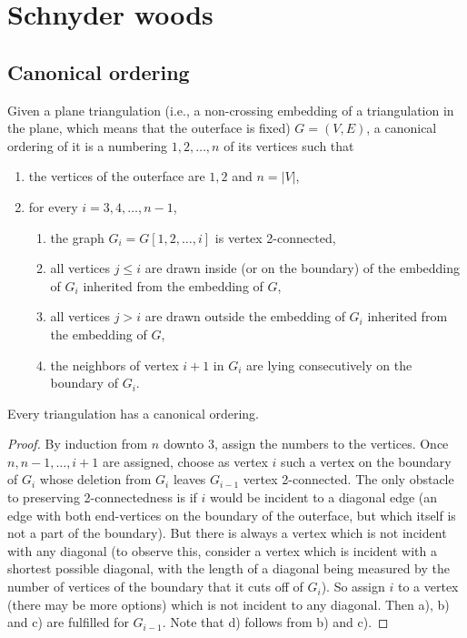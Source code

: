 \chapter{Schnyder woods}

\section{Canonical ordering}

\begin{defn}
	Given a plane triangulation (i.e., a non-crossing embedding of a triangulation in the plane, which means that the outerface is fixed) $G = (V, E)$, a canonical ordering of it is a numbering $1, 2, \dots, n$ of its vertices such that
	
	\begin{enumerate}[i]
		\item the vertices of the outerface are $1, 2$ and $n = |V|$,
		\item for every $i = 3, 4, \dots, n - 1$,
		\begin{enumerate}[a]
			\item the graph $G_i = G[1, 2, \dots, i]$ is vertex 2-connected,
			\item all vertices $j \leq i$ are drawn inside (or on the boundary) of the embedding of $G_i$ inherited from the embedding of $G$,
			\item all vertices $j > i$ are drawn outside the embedding of $G_i$ inherited from the embedding of $G$,
			\item the neighbors of vertex $i + 1$ in $G_i$ are lying consecutively on the boundary of $G_i$.
		\end{enumerate}
	\end{enumerate}
\end{defn}

\begin{thm}
	Every triangulation has a canonical ordering.
\end{thm}

\begin{proof}
	By induction from $n$ downto $3$, assign the numbers to the vertices. Once $n, n - 1, \dots, i + 1$ are assigned, choose as vertex $i$ such a vertex on the boundary of $G_i$ whose deletion from $G_i$ leaves $G_{i-1}$ vertex 2-connected. The only obstacle to preserving 2-connectedness is if $i$ would be incident to a diagonal edge (an edge with both end-vertices on the boundary of the outerface, but which itself is not a part of the boundary). But there is always a vertex which is not incident with any diagonal (to observe this, consider a vertex which is incident with a shortest possible diagonal, with the length of a diagonal being measured by the number of vertices of the boundary that it cuts off of $G_i$). So assign $i$ to a vertex (there may be more options) which is not incident to any diagonal. Then a), b) and c) are fulfilled for $G_{i-1}$. Note that d) follows from b) and c).
\end{proof}

